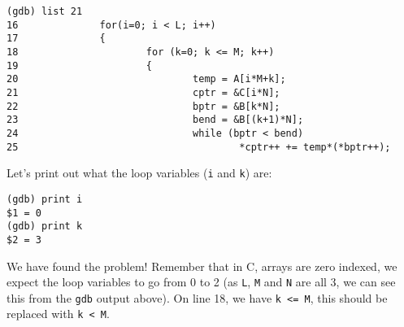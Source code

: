 \documentclass[a4paper,12pt]{article}
\begin{document}
\begin{verbatim}
(gdb) list 21
16              for(i=0; i < L; i++)
17              {
18                      for (k=0; k <= M; k++)
19                      {
20                              temp = A[i*M+k];
21                              cptr = &C[i*N];
22                              bptr = &B[k*N];
23                              bend = &B[(k+1)*N];
24                              while (bptr < bend)
25                                      *cptr++ += temp*(*bptr++);
\end{verbatim}
Let's print out what the loop variables ({\tt i} and {\tt k}) are:
\begin{verbatim}
(gdb) print i
$1 = 0
(gdb) print k
$2 = 3
\end{verbatim}
We have found the problem! Remember that in C, arrays are zero indexed, we expect the loop variables to go from 0 to 2 (as {\tt L}, {\tt M} and {\tt N} are all 3, we can see this from the {\tt gdb} output above). On line 18,  we have {\tt k <= M}, this should be replaced with {\tt k < M}.
 
\end{document}
